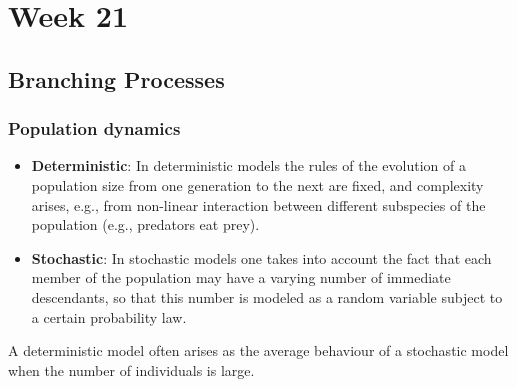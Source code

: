 \documentclass{article}
\begin{document}
\section{Week 21}
\subsection{Branching Processes}
\subsubsection{Population dynamics}
\begin{itemize}
    \item \textbf{Deterministic}: In deterministic models the rules of the evolution of a population size from one generation to the next are fixed, and complexity arises, e.g., from non-linear interaction between different subspecies of the population (e.g., predators eat prey).
    \item \textbf{Stochastic}: In stochastic models one takes into account the fact that each member of the population may have a varying number of immediate descendants, so that this number is modeled as a random variable subject to a certain probability law.
\end{itemize}
A deterministic model often arises as the average behaviour of a stochastic model when the number of individuals is large.
\end{document}

